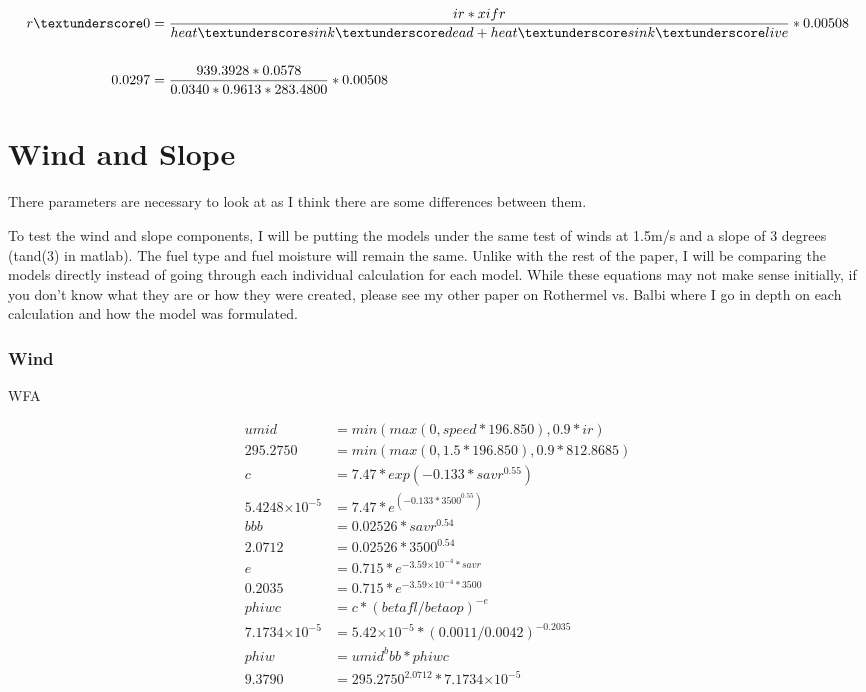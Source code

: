 \documentclass{article}
\newcommand\tenpow[1]{\ensuremath{{\times}10^{#1}}}
\newcommand\und{\textunderscore}
\begin{document}
	\begin{equation}
	\label{r0_WFA_2}
	\begin{split}
	r\und 0 &= \frac{ir * xifr}{heat\und sink\und dead + heat\und sink\und live} * 0.00508 \\
	\\
	0.0297 &= \frac{939.3928 * 0.0578}{0.0340 * 0.9613 * 283.4800} * 0.00508
	\end{split}
\end{equation}


\section{Wind and Slope}

There parameters are necessary to look at as I think there are some differences between them. 

To test the wind and slope components, I will be putting the models under the same test of winds at 1.5m/s and a slope of 3 degrees (tand(3) in matlab). The fuel type and fuel moisture will remain the same. Unlike with the rest of the paper, I will be comparing the models directly instead of going through each individual calculation for each model. While these equations may not make sense initially, if you don't know what they are or how they were created, please see my other paper on Rothermel vs. Balbi where I go in depth on each calculation and how the model was formulated. 


\subsubsection*{Wind}
WFA

\begin{equation}
	\label{wind_WFA_umid}
	\begin{split}
		umid     &= min(max(0, speed * 196.850), 0.9 * ir) \\ %
		295.2750 &= min(max(0, 1.5 * 196.850), 0.9 * 812.8685) \\
		c        &= 7.47 * exp(-0.133 * savr^{0.55}) \\ %
		5.4248 \tenpow{-5} &= 7.47 * e^{(-0.133 * 3500^{0.55})} \\
		bbb &= 0.02526 * savr^{0.54} \\ %
		2.0712 &= 0.02526 * 3500^{0.54} \\
		e &= 0.715 * e^{-3.59\tenpow{-4} * savr} \\ %
		0.2035 &= 0.715 * e^{-3.59\tenpow{-4} * 3500} \\
		phiwc    &= c * (betafl/betaop)^{-e} \\
		7.1734\tenpow{-5} &= 5.42 \tenpow{-5} * (0.0011/0.0042)^{-0.2035} \\
		phiw     &= umid^bbb * phiwc \\
		9.3790 &= 295.2750 ^ {2.0712} * 7.1734\tenpow{-5}
	\end{split}
\end{equation}
\end{document}
